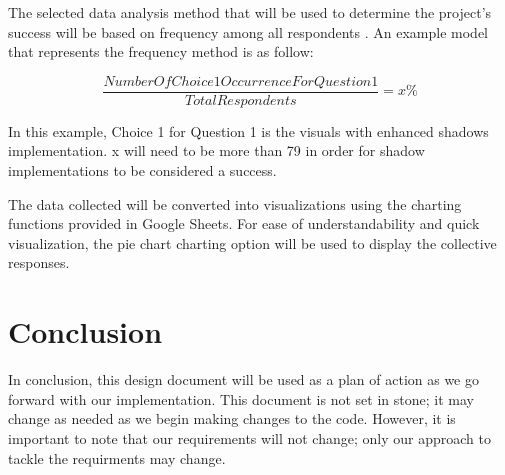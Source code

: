 \documentclass[10pt,journal,compsoc,draftclsnofoot]{IEEEtran}
\begin{document}
\begin{flushleft}
The selected data analysis method that will be used to determine the project's success will be based on frequency among all respondents \cite{SManalysis}. 
An example model that represents the frequency method is as follow:

\begin{equation}
\frac{Number Of Choice 1 Occurrence For Question 1}{Total Respondents} = x\%
\end{equation}

\vspace{3mm}
In this example, Choice 1 for Question 1 is the visuals with enhanced shadows implementation. 
x will need to be more than 79 in order for shadow implementations to be considered a success.

The data collected will be converted into visualizations using the charting functions provided in Google Sheets. 
For ease of understandability and quick visualization, the pie chart charting option will be used to display the collective responses. 

\newpage

\section{Conclusion}
In conclusion, this design document will be used as a plan of action as we go forward with our implementation.
This document is not set in stone; it may change as needed as we begin making changes to the code.
However, it is important to note that our requirements will not change; only our approach to tackle the requirments may change.

\end{flushleft}
\end{document}
